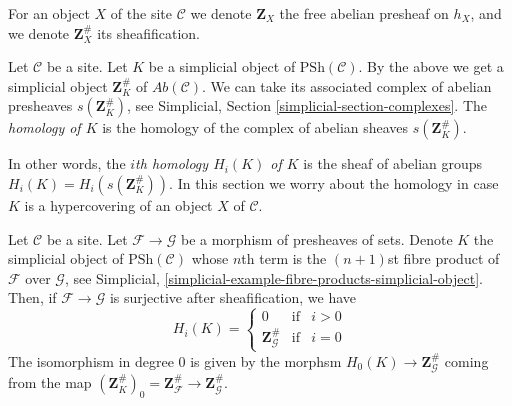 \medskip\noindent
For an object $X$ of the site $\mathcal{C}$ we denote
$\mathbf{Z}_X$ the free abelian presheaf on $h_X$, and
we denote $\mathbf{Z}_X^\#$ its sheafification.

\begin{definition}
\label{definition-homology}
Let $\mathcal{C}$ be a site.
Let $K$ be a simplicial object of $\text{PSh}(\mathcal{C})$.
By the above we get a simplicial object $\mathbf{Z}_K^\#$ of
$\textit{Ab}(\mathcal{C})$. We can take its associated
complex of abelian presheaves $s(\mathbf{Z}_K^\#)$, see
Simplicial, Section \ref{simplicial-section-complexes}.
The {\it homology of $K$} is the homology of the
complex of abelian sheaves $s(\mathbf{Z}_K^\#)$.
\end{definition}

\noindent
In other words, the {\it $i$th homology $H_i(K)$ of $K$}
is the sheaf of abelian groups $H_i(K) = H_i(s(\mathbf{Z}_K^\#))$.
In this section we worry about the homology in case $K$
is a hypercovering of an object $X$ of $\mathcal{C}$.

\begin{lemma}
\label{lemma-compare-cosk0}
Let $\mathcal{C}$ be a site.
Let $\mathcal{F} \to \mathcal{G}$ be a morphism
of presheaves of sets. Denote $K$ the simplicial
object of $\text{PSh}(\mathcal{C})$ whose $n$th
term is the $(n + 1)$st fibre product of $\mathcal{F}$
over $\mathcal{G}$, see
Simplicial, \ref{simplicial-example-fibre-products-simplicial-object}.
Then, if $\mathcal{F} \to \mathcal{G}$ is surjective after
sheafification, we have
$$
H_i(K) =
\left\{
\begin{matrix}
0 & \text{if} & i > 0\\
\mathbf{Z}_\mathcal{G}^\# & \text{if} & i = 0
\end{matrix}
\right.
$$
The isomorphism in degree $0$ is given by the
morphsm $H_0(K) \to \mathbf{Z}_\mathcal{G}^\#$
coming from the map $(\mathbf{Z}_K^\#)_0 =
\mathbf{Z}_\mathcal{F}^\# \to \mathbf{Z}_\mathcal{G}^\#$.
\end{lemma}

